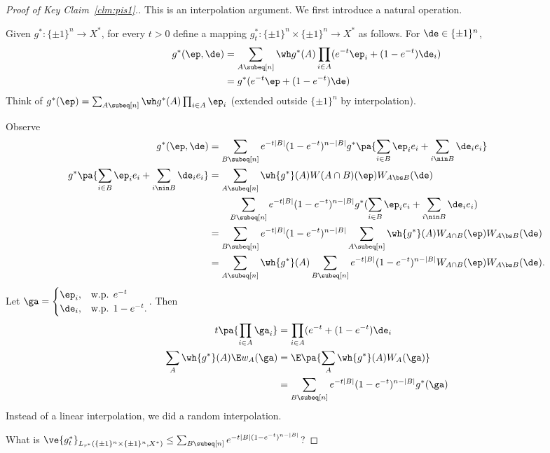 \begin{proof}[Proof of Key Claim~\ref{clm:pis1}.]
This is an interpolation argument. We first introduce a natural operation.

Given $g^*:\{\pm 1\}^n\to X^*$, for every $t>0$ define a mapping $g_t^*:\{\pm 1\}^n\times \{\pm 1\}^n\to X^*$ as follows. For $\de\in \{\pm 1\}^n$, 
\begin{align}
g^*(\ep,\de) &= \sum_{A\subeq [n]} \wh g^*(A) \prod_{i\in A} (e^{-t}\ep_i + (1-e^{-t}) \de_i)\\
& = g^*(e^{-t} \ep + (1-e^{-t}) \de)
\end{align}
Think of $g^*(\ep) = \sum_{A\subeq [n]} \wh g^*(A) \prod_{i\in A}\ep_i$ (extended outside $\{\pm 1\}^n$ by interpolation).

Observe 
\begin{align}
g^*(\ep,\de)& = %
\sum_{B\subeq [n]} e^{-t|B|} (1-e^{-t})^{n-|B|} g^*\pa{\sum_{i\in B} \ep_i e_i + \sum_{i\nin B} \de_i e_i}\\
g^*\pa{
\sum_{i\in B} \ep_ie_i + \sum_{i\nin B} \de_ie_i
}&= \sum_{A\subeq [n]} \wh{g^*}(A) W(A\cap B)(\ep)W_{A\bs B}(\de)\\
&\qquad
\sum_{B\subeq [n]} e^{-t|B|} (1-e^{-t})^{n-|B|} g^*(\sum_{i\in B} \ep_i e_i + \sum_{i\nin B} \de_i e_i)\\
&= \sum_{B\subeq [n]} e^{-t|B|}(1-e^{-t})^{n-|B|} \sum_{A\subeq [n]} \wh{g^*}(A) W_{A\cap B}(\ep)W_{A\bs B}(\de)\\
&=\sum_{A\subeq [n]}\wh{g^*}(A) \sum_{B\subeq [n]} e^{-t|B|}(1-e^{-t})^{n-|B|} W_{A\cap B}(\ep)W_{A\bs B}(\de).
\end{align}
Let $\ga= \begin{cases}
\ep_i,&\text{w.p. }e^{-t}\\
\de_i,&\text{w.p. }1-e^{-t}.
\end{cases}$.
Then
\begin{align}%
t\pa{\prod_{i\in A} \ga_i} & =\prod_{i\in A}(e^{-t}+ (1-e^{-t})\de_i\\
\sum_A \wh{g^*}(A) \E w_A(\ga) & = \E\pa{\sum_A \wh{g^*}(A)W_A(\ga)}\\
&=\sum_{B\subeq [n]} e^{-t|B|} (1-e^{-t})^{n-|B|}g^*(\ga)
\end{align}
Instead of a linear interpolation, we did a random interpolation.

What is $\ve{g_t^*}_{L_{r^*}(\{\pm 1\}^n\times \{\pm 1\}^n, X^*)} \le \sum_{B\subeq [n]} e^{-t|B|(1-e^{-t})^{n-|B|}}$? 
\end{proof}